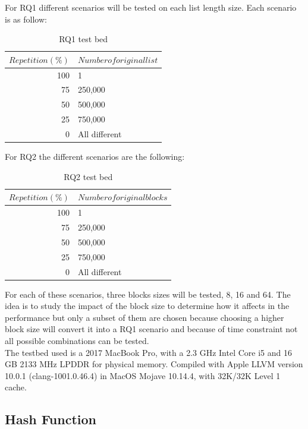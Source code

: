 \documentclass[a4paper,12pt]{article}
\begin{document}
For RQ1 different scenarios will be tested on each list length size. Each scenario is as follow:
\\

\begin{table}[H]
\centering
\begin{tabular}{|r|l|}  \hline
	{$Repetition (\%) $} & {$Number of original list$}  \\  \hline
	100 & 1 \\
	75 & 250,000\\
	50 & 500,000 \\
	25 & 750,000\\
	0 & All different \\  \hline
\end{tabular}
\caption{RQ1 test bed}
\end{table}

For RQ2 the different scenarios are the following:
\\
\begin{table}[H]
\centering
\begin{tabular}{|r|l|}  \hline
	{$Repetition (\%)$} & {$Number of original blocks$}  \\  \hline
	100 & 1 \\
	75& 250,000 \\
	50& 500,000 \\
	25& 750,000 \\
	0 &  All different \\  \hline
\end{tabular}
\caption{RQ2 test bed}
\end{table}

For each of these scenarios, three blocks sizes will be tested,  8, 16 and 64. The idea is to study the impact of the block size to determine how it affects in the performance but only a subset of them are chosen because choosing a higher block size will convert it into a RQ1 scenario and because of time constraint not all possible combinations can be tested. \\

The testbed used is a 2017 MacBook Pro, with a 2.3 GHz Intel Core i5 and 16 GB 2133 MHz LPDDR for physical memory. Compiled with Apple LLVM version 10.0.1 (clang-1001.0.46.4) in MacOS Mojave 10.14.4, with 32K/32K Level 1 cache.

\subsection{Hash Function}
\end{document}
